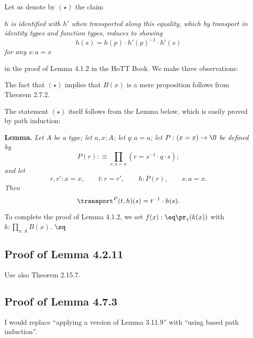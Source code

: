 \documentclass[12pt]{article}
\begin{document}
Let us denote by $(\star)$ the claim 

\nn\emph{$h$ is identified with $h'$ when transported along this equality, which by transport in identity types and function types, reduces to showing 
$$
h(s)=h(p)\cdot h'(p)^{-1}\cdot h'(s)
$$ 
for any $s:a=x$}

\nn in the proof of Lemma 4.1.2 in the HoTT Book. We make three observations:

\nn{} The fact that $(\star)$ implies that $B(x)$ is a mere proposition follows from Theorem 2.7.2. 

\nn{} The statement $(\star)$ itself follows from the Lemma below, which is easily proved by path induction:

\nn\textbf{Lemma.} \emph{Let $A$ be a type; let $a,x:A$; let $q:a=a$; let $P:(x=x)\to\U$ be defined by} 
$$
P(r):\equiv\prod_{s:a=x}(r=s^{-1}\cdot q\cdot s);
$$ 
\emph{and let} 
$$
r,r':x=x,\qquad t:r=r',\qquad h:P(r),\qquad s:a=x.
$$ 
\emph{Then} 
$$
\transport^P(t,h)(s)=t^{-1}\cdot h(s).
$$ 

\nn{} To complete the proof of Lemma 4.1.2, we set $f(x):\eq\pr_1(k(x))$ with $k:\prod_{x:A}B(x)$. $\sq$


\subsection{Proof of Lemma 4.2.11}

Use also Theorem 2.15.7. 


\subsection{Proof of Lemma 4.7.3}

I would replace ``applying a version of Lemma 3.11.9'' with ``using based path induction''.


\end{document}
